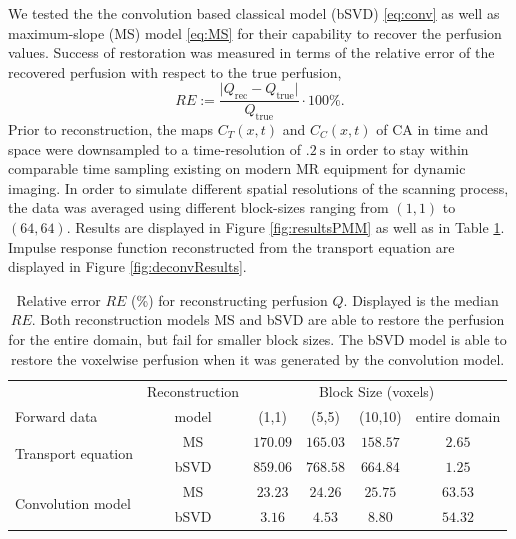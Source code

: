 \documentclass[paper=a4, fontsize=11pt,parskip=half,headings=small]{scrartcl}
\newcommand{\Perf}{Q}
\begin{document}
	We tested the the convolution based classical model (bSVD) \eqref{eq:conv} as well as maximum-slope (MS) model \eqref{eq:MS} for their capability to recover the perfusion values.
	Success of restoration was measured in terms of the relative error of the recovered perfusion with respect to the true perfusion,
	\begin{equation}
		RE := \frac{\vert \Perf_{\mathrm{rec}} - \Perf_{\mathrm{true}}\vert}{\Perf_{\mathrm{true}}}\cdot 100\%.
	\end{equation}
	Prior to reconstruction, the maps $C_T(x,t)$ and $C_C(x,t)$ of CA in time and space were downsampled to a time-resolution of $\SI{.2}{\second}$ in order to stay within comparable time sampling existing on modern MR equipment for dynamic imaging.
	In order to simulate different spatial resolutions of the scanning process, the data was averaged using different block-sizes ranging from $(1,1)$ to $(64,64)$.
	Results are displayed in Figure \ref{fig:resultsPMM} as well as in Table \ref{tab:resultsSim}.
	Impulse response function reconstructed from the transport equation are displayed in Figure \ref{fig:deconvResults}.	
	
	\begin{table}[H]
		\caption{Relative error $RE$ (\%) for reconstructing perfusion $\Perf$. Displayed is the median $RE$. Both reconstruction models MS and bSVD are able to restore the perfusion for the entire domain, but fail for smaller block sizes. The bSVD model is able to restore the voxelwise perfusion when it was generated by the convolution model. }
		\centering
		\begin{tabular}{l c c c c c }
			 & Reconstruction & \multicolumn{4}{c}{Block Size (voxels)}\\
			Forward data 		& model		& (1,1) 	& (5,5)		& (10,10)	& entire domain \\
			\toprule
			\multirow{2}{*}{Transport equation} & MS 	& $170.09$ 	& $165.03$ 	& $158.57$	& $2.65$ \\
			 					 	   		& bSVD  & $859.06$ 	& $768.58$ 	& $664.84$	& $1.25$ \\
			\multirow{2}{*}{Convolution model} & MS 	& $23.23$ 	& $24.26$ 	& $25.75$ 	& $63.53$ \\ %
			 					 			& bSVD  & $3.16$ 	& $4.53$ 	& $8.80$ 	& $54.32$ \\ %
		\end{tabular}
		\label{tab:resultsSim}
	\end{table}
\end{document}
